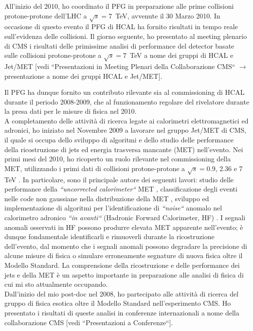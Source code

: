 \documentclass[10pt, a4paper]{article}
\begin{document}
All'inizio del 2010, ho coordinato il PFG in preparazione alle 
prime collisioni protone-protone dell'LHC a $\sqrt{s}=7$~TeV, avvenute il 30 Marzo 2010. In occasione di questo evento 
il PFG di HCAL ha fornito risultati in tempo reale sull'evidenza delle collisioni. Il giorno seguente, ho presentato al meeting 
plenario di CMS i risultati delle primissime analisi di performance del detector basate sulle collisioni 
protone-protone a $\sqrt{s}=7$~TeV a nome dei gruppi di HCAL e Jet/MET 
[vedi ``Presentazioni in Meeting Plenari della Collaborazione CMS`` $\rightarrow$ presentazione 
a nome dei gruppi HCAL e Jet/MET].

Il PFG ha dunque fornito un contributo rilevante sia al commissioning 
di HCAL durante il periodo 2008-2009, che al funzionamento regolare del rivelatore durante la presa dati 
per le misure di fisica nel 2010. \\

A completamento delle attivit\`a di ricerca legate ai calorimetri elettromagnetici ed adronici, ho iniziato nel Novembre 2009 a 
lavorare nel gruppo Jet/MET di CMS, il quale si occupa dello sviluppo di algoritmi e dello studio delle performance della ricostruzione 
di jets ed energia trasversa mancante (MET) nell'evento. Nei primi mesi del 2010, ho ricoperto un ruolo rilevante nel commissioning 
della MET, utilizzando i primi dati di collisioni protone-protone a $\sqrt{s}=$0.9, 2.36 \cite{JME-10-002} e 7 TeV \cite{JME-10-004}.
In particolare, sono il principale autore dei seguenti lavori: studio delle performance della {\it ``uncorrected calorimeter``} 
MET \cite{AN-2010-029},  classificazione degli eventi nelle code non gaussiane nella distribuzione della MET \cite{AN-2010-219}, 
sviluppo ed implementazione di algoritmi per l'identificazione di {\it ``noise``} anomalo nel calorimetro 
adronico {\it ``in avanti``} (Hadronic Forward Calorimeter, HF) \cite{DN-2010-008}. I segnali anomali 
osservati in HF possono produrre elevata MET apparente nell'evento; \`e dunque fondamentale 
identificarli e rimuoverli durante la ricostruzione dell'evento, dal momento che i segnali anomali possono 
degradare la precisione di alcune misure di fisica o simulare erroneamente segnature di nuova fisica oltre il Modello Standard. 
La comprensione della ricostruzione e delle performance dei jets e della MET \`e un aspetto importante 
in preparazione alle analisi di fisica di cui mi sto attualmente occupando. \\

Dall'inizio del mio post-doc nel 2008, ho partecipato alle attivit\`a di ricerca del gruppo di fisica esotica oltre il 
Modello Standard nell'esperimento CMS. Ho presentato i risultati di queste analisi in conferenze internazionali  
a nome della collaborazione CMS [vedi ``Presentazioni a Conferenze``]. \\
\end{document}
